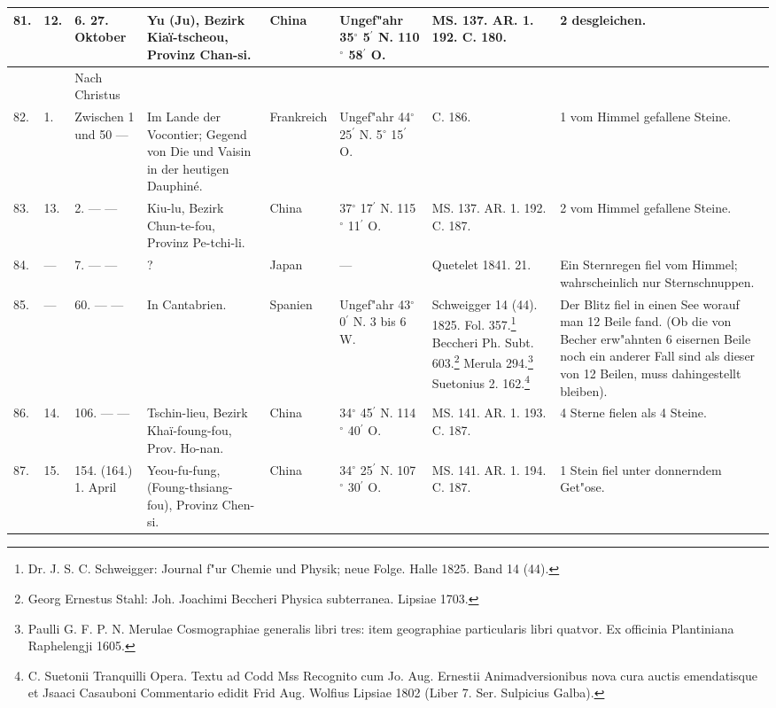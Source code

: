 \documentclass[a4paper, 8pt, oneside, polutonikogreek, german]{article}
\begin{document}
\begin{center}
\begin{longtable}{| p{5mm} | p{3mm} | p{15mm} | p{25mm} | p{20mm} | p{14mm} | p{17mm} | p{24mm} |}
        81. & 12. & 6. 27. Oktober & Yu (Ju), Bezirk Kiaï-tscheou, Provinz Chan-si. & China & Ungef"ahr 35$^\circ$ 5$^\prime$ N. 110$^\circ$ 58$^\prime$ O. & MS. 137. AR. 1. 192. C. 180. & 2 desgleichen. \\ \hline
          &   & Nach Christus &   &   &   &   &   \\ \hline
        82. & 1. & Zwischen 1 und 50 --- & Im Lande der Vocontier; Gegend von Die und Vaisin in der heutigen Dauphiné. & Frankreich & Ungef"ahr 44$^\circ$ 25$^\prime$ N. 5$^\circ$ 15$^\prime$ O. & C. 186. & 1 vom Himmel gefallene Steine. \\ \hline
        83. & 13. & 2. --- --- & Kiu-lu, Bezirk Chun-te-fou, Provinz Pe-tchi-li. & China & 37$^\circ$ 17$^\prime$ N. 115$^\circ$ 11$^\prime$ O. & MS. 137. AR. 1. 192. C. 187. & 2 vom Himmel gefallene Steine. \\ \hline
        84. & --- & 7. --- --- & ? & Japan & --- & Quetelet 1841. 21. & Ein Sternregen fiel vom Himmel; wahrscheinlich nur Sternschnuppen. \\ \hline
        85. & --- & 60. --- --- & In Cantabrien. & Spanien & Ungef"ahr 43$^\circ$ 0$^\prime$ N. 3 bis 6 W. & Schweigger 14 (44). 1825. Fol. 357.\footnote{Dr. J. S. C. Schweigger: Journal f"ur Chemie und Physik; neue Folge. Halle 1825. Band 14 (44).} Beccheri Ph. Subt. 603.\footnote{Georg Ernestus Stahl: Joh. Joachimi Beccheri Physica subterranea. Lipsiae 1703.} Merula 294.\footnote{Paulli G. F. P. N. Merulae Cosmographiae generalis libri tres: item geographiae particularis libri quatvor. Ex officinia Plantiniana Raphelengji 1605.} Suetonius 2. 162.\footnote{C. Suetonii Tranquilli Opera. Textu ad Codd Mss Recognito cum Jo. Aug. Ernestii Animadversionibus nova cura auctis emendatisque et Jsaaci Casauboni Commentario edidit Frid Aug. Wolfius Lipsiae 1802 (Liber 7. Ser. Sulpicius Galba).
} & Der Blitz fiel in einen See worauf man 12 Beile fand. (Ob die von Becher erw"ahnten 6 eisernen Beile noch ein anderer Fall sind als dieser von 12 Beilen, muss dahingestellt bleiben). \\ \hline
        86. & 14. & 106. --- --- & Tschin-lieu, Bezirk Khaï-foung-fou, Prov. Ho-nan. & China & 34$^\circ$ 45$^\prime$ N. 114$^\circ$ 40$^\prime$ O. & MS. 141. AR. 1. 193. C. 187. & 4 Sterne fielen als 4 Steine. \\ \hline
        87. & 15. & 154. (164.) 1. April & Yeou-fu-fung, (Foung-thsiang-fou), Provinz Chen-si. & China & 34$^\circ$ 25$^\prime$ N. 107$^\circ$ 30$^\prime$ O. & MS. 141. AR. 1. 194. C. 187. & 1 Stein fiel unter donnerndem Get"ose. \\ \hline

\end{longtable}
\end{center}
\end{document}
